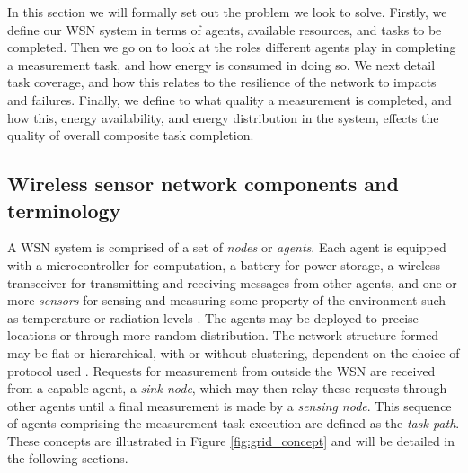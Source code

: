 In this section we will formally set out the problem we look to solve. Firstly, we define our WSN system in terms of agents, available resources, and tasks to be completed. Then we go on to look at the roles different agents play in completing a measurement task, and how energy is consumed in doing so. We next detail task coverage, and how this relates to the resilience of the network to impacts and failures. Finally, we define to what quality a measurement is completed, and how this, energy availability, and energy distribution in the system, effects the quality of overall composite task completion. 

\subsection{Wireless sensor network components and terminology}

A WSN system is comprised of a set of \textit{nodes} or \textit{agents}. Each agent is equipped with a microcontroller for computation, a battery for power storage, a wireless transceiver for  transmitting and receiving messages from other agents, and one or more \textit{sensors} for sensing and measuring some property of the environment such as temperature or radiation levels \citep{muhammad_r_ahmed_2012_1072589}. The agents may be deployed to precise locations or through more random distribution. The network structure formed may be flat or hierarchical, with or without clustering, dependent on the choice of protocol used \citep{Carlos-Mancilla2016b}. Requests for measurement from outside the WSN are received from a capable agent, a \textit{sink node}, which may then relay these requests through other agents until a final measurement is made by a \textit{sensing node}. This sequence of agents comprising the measurement task execution are defined as the \textit{task-path}. These concepts are illustrated in Figure \ref{fig:grid_concept} and will be detailed in the following sections.